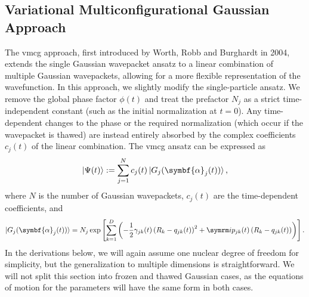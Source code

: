 \subsection{Variational Multiconfigurational Gaussian Approach}
The \gls{vmcg} approach, first introduced by Worth, Robb and Burghardt in 2004,\supercite{10.1039/B314253A} extends the single Gaussian wavepacket ansatz to a linear combination of multiple Gaussian wavepackets, allowing for a more flexible representation of the wavefunction. In this approach, we slightly modify the single-particle ansatz. We remove the global phase factor $\phi(t)$ and treat the prefactor $N_j$ as a strict time-independent constant (such as the initial normalization at $t=0$). Any time-dependent changes to the phase or the required normalization (which occur if the wavepacket is thawed) are instead entirely absorbed by the complex coefficients $c_j(t)$ of the linear combination. The \gls{vmcg} ansatz can be expressed as
\begin{equation}
\ket{\Psi(t)}:=\sum_{j=1}^N c_j(t)\ket{G_j(\symbf{\alpha}_j(t))},
\end{equation}
where $N$ is the number of Gaussian wavepackets, $c_j(t)$ are the time-dependent coefficients, and
\begin{equation}\label{eq:vmcg_gaussian_wavepacket}
\ket{G_j(\symbf{\alpha}_j(t))}=N_j\exp\left[\sum_{k=1}^D\left(-\frac{1}{2}\gamma_{jk}(t)\left(R_k-q_{jk}(t)\right)^2+\i p_{jk}(t)\left(R_k-q_{jk}(t)\right)\right)\right].
\end{equation}
In the derivations below, we will again assume one nuclear degree of freedom for simplicity, but the generalization to multiple dimensions is straightforward. We will not split this section into frozen and thawed Gaussian cases, as the equations of motion for the parameters will have the same form in both cases.

